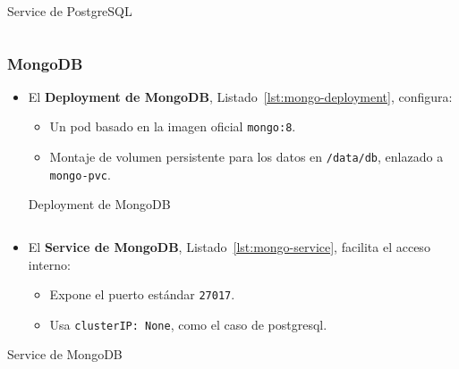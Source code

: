 \begin{longlisting}
\caption{Service de PostgreSQL}
\inputminted[firstline=118,lastline=129]{yaml}{../backend/despliegue/kubernetes/despliegue.yaml}
\label{lst:postgres-service}
\end{longlisting}


\subsubsection*{MongoDB}
\begin{itemize}
  \item El \textbf{Deployment de MongoDB}, Listado~\ref{lst:mongo-deployment}, configura:
  \begin{itemize}
    \item Un pod basado en la imagen oficial \texttt{mongo:8}.
    \item Montaje de volumen persistente para los datos en \texttt{/data/db}, enlazado a \texttt{mongo-pvc}.
  \end{itemize}

  \begin{longlisting}
\caption{Deployment de MongoDB}
\inputminted[firstline=133,lastline=158]{yaml}{../backend/despliegue/kubernetes/despliegue.yaml}
\label{lst:mongo-deployment}
\end{longlisting}

  \item El \textbf{Service de MongoDB}, Listado~\ref{lst:mongo-service}, facilita el acceso interno:
  \begin{itemize}
    \item Expone el puerto estándar \texttt{27017}.
    \item Usa \texttt{clusterIP: None}, como el caso de \gls{postgresql}.
  \end{itemize}
\end{itemize}



\begin{longlisting}
\caption{Service de MongoDB}
\inputminted[firstline=160,lastline=170]{yaml}{../backend/despliegue/kubernetes/despliegue.yaml}
\label{lst:mongo-service}
\end{longlisting}


